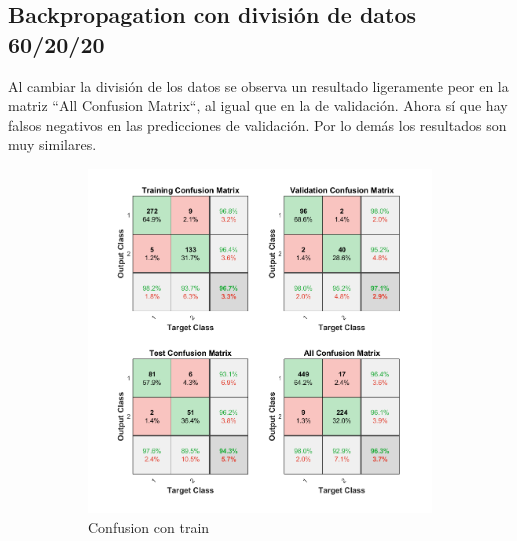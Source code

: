 \documentclass[a4paper, 12pt]{article}
\begin{document}
            \newpage
            \subsection{Backpropagation con división de datos 60/20/20}
                Al cambiar la división de los datos se observa un resultado ligeramente peor en la matriz ``All Confusion Matrix``, al igual que en la de validación. Ahora sí que hay falsos negativos en las predicciones de validación. Por lo demás los resultados son muy similares.
                \begin{figure}[htp!]
                    \caption{Gráficas con Backpropagation con división 60/20/20}
                    \begin{subfigure}{0.49\textwidth}
                        \centering
        		      \includegraphics[width=\textwidth]{figures/parte1/Ej4/ej4_confusion_train_60.png}
                        \caption{Confusion con train}
                    \end{subfigure}
                    \begin{subfigure}{0.49\textwidth}

\end{subfigure}
\end{figure}
\end{document}
